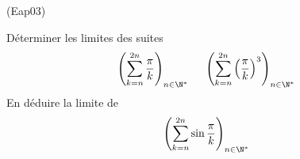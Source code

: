 \begin{tiny}(Eap03)\end{tiny}
Déterminer les limites des suites 
\begin{displaymath}
 \left(\sum_{k=n}^{2n}\frac{\pi}{k}\right)_{n\in\N^*}\hspace{0.5cm}
  \left(\sum_{k=n}^{2n}\left( \frac{\pi}{k}\right)^3 \right)_{n\in\N^*}
\end{displaymath}
En déduire la limite de 
\begin{displaymath}
 \left(\sum_{k=n}^{2n}\sin \frac{\pi}{k}\right)_{n\in\N^*}
\end{displaymath}

